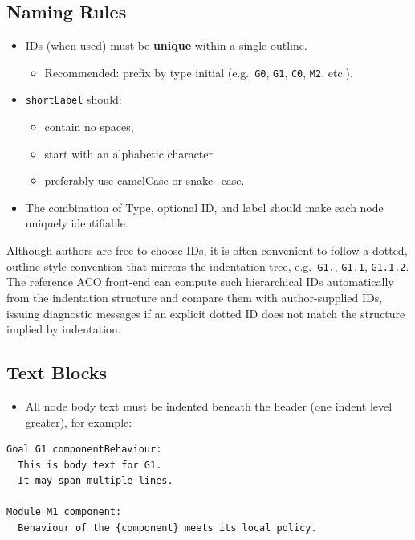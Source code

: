 \documentclass[11pt]{article}
\begin{document}
\subsection{Naming Rules}

\begin{itemize}[leftmargin=2em]
  \item IDs (when used) must be \textbf{unique} within a single outline.
  \begin{itemize}[leftmargin=1.5em]
    \item Recommended: prefix by type initial (e.g.\ \texttt{G0}, \texttt{G1}, \texttt{C0}, \texttt{M2}, etc.).
  \end{itemize}

  \item \texttt{shortLabel} should:
  \begin{itemize}[leftmargin=1.5em]
    \item contain no spaces,
    \item start with an alphabetic character
    \item preferably use camelCase or snake\_case.
  \end{itemize}

  \item The combination of Type, optional ID, and label should make each node uniquely identifiable.
\end{itemize}

Although authors are free to choose IDs, it is often convenient to follow a dotted, outline-style convention that mirrors the indentation tree, e.g.\ \texttt{G1.}, \texttt{G1.1}, \texttt{G1.1.2}. The reference ACO front-end can compute such hierarchical IDs automatically from the indentation structure and compare them with author-supplied IDs, issuing diagnostic messages if an explicit dotted ID does not match the structure implied by indentation.

\subsection{Text Blocks}

\begin{itemize}[leftmargin=2em]
  \item All node body text must be indented beneath the header (one indent level greater), for example:
\end{itemize}

\begin{verbatim}
Goal G1 componentBehaviour:
  This is body text for G1.
  It may span multiple lines.

Module M1 component:
  Behaviour of the {component} meets its local policy.
\end{verbatim}
\end{document}
